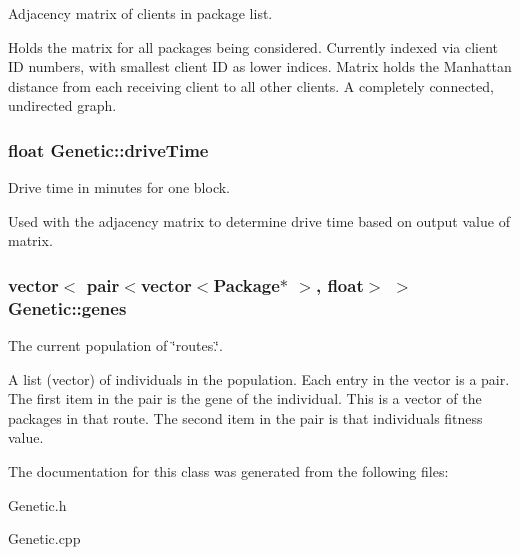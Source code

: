 Adjacency matrix of clients in package list. 

Holds the matrix for all packages being considered. Currently indexed via client ID numbers, with smallest client ID as lower indices. Matrix holds the Manhattan distance from each receiving client to all other clients. A completely connected, undirected graph. 
\subsubsection[{\texorpdfstring{drive\+Time}{driveTime}}]{\setlength{\rightskip}{0pt plus 5cm}float Genetic\+::drive\+Time\hspace{0.3cm}{\ttfamily [private]}}\hypertarget{classGenetic_a060cb30bbd912dd78fbf567410746631}{}\label{classGenetic_a060cb30bbd912dd78fbf567410746631}


Drive time in minutes for one block. 

Used with the adjacency matrix to determine drive time based on output value of matrix. 
\subsubsection[{\texorpdfstring{genes}{genes}}]{\setlength{\rightskip}{0pt plus 5cm}vector$<$ pair$<$vector$<${\bf Package}$\ast$ $>$, float$>$ $>$ Genetic\+::genes\hspace{0.3cm}{\ttfamily [private]}}\hypertarget{classGenetic_ad85db12db467d5cbc46df9d50f9877e8}{}\label{classGenetic_ad85db12db467d5cbc46df9d50f9877e8}


The current population of \char`\"{}routes.\char`\"{}. 

A list (vector) of individuals in the population. Each entry in the vector is a pair. The first item in the pair is the gene of the individual. This is a vector of the packages in that route. The second item in the pair is that individual\textquotesingle{}s fitness value. 

The documentation for this class was generated from the following files\+:\begin{DoxyCompactItemize}
\item 
Genetic.\+h\item 
Genetic.\+cpp\end{DoxyCompactItemize}
